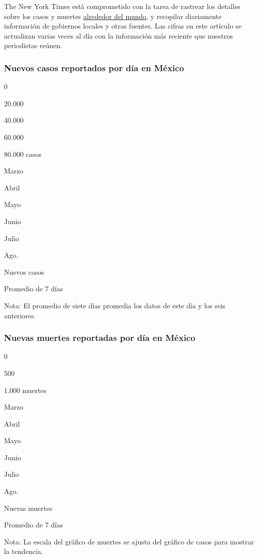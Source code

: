 The New York Times está comprometido con la tarea de rastrear los
detalles sobre los casos y muertes
\href{https://www.nytimes.com/interactive/2020/world/coronavirus-maps.html}{alrededor
del mundo}, y recopilar diariamente información de gobiernos locales y
otras fuentes. Las cifras en este artículo se actualizan varias veces al
día con la información más reciente que nuestros periodistas reúnen.

\hypertarget{nuevos-casos-reportados-por-duxeda-en-muxe9xico}{%
\subsubsection{Nuevos casos reportados por día en
México}\label{nuevos-casos-reportados-por-duxeda-en-muxe9xico}}

0

20.000

40.000

60.000

80.000 casos

Marzo

Abril

Mayo

Junio

Julio

Ago.

Nuevos casos

Promedio de 7 días

Nota: El promedio de siete días promedia los datos de este día y los
seis anteriores.

\hypertarget{nuevas-muertes-reportadas-por-duxeda-en-muxe9xico}{%
\subsubsection{Nuevas muertes reportadas por día en
México}\label{nuevas-muertes-reportadas-por-duxeda-en-muxe9xico}}

0

500

1.000 muertes

Marzo

Abril

Mayo

Junio

Julio

Ago.

Nuevas muertes

Promedio de 7 días

Nota: La escala del gráfico de muertes se ajusta del gráfico de casos
para mostrar la tendencia.

